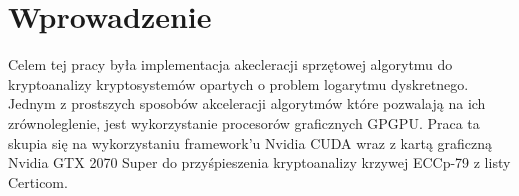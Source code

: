 \newpage
\section{Wprowadzenie}
Celem tej pracy była implementacja akecleracji sprzętowej algorytmu do kryptoanalizy kryptosystemów opartych
o problem logarytmu dyskretnego. Jednym z prostszych sposobów akceleracji algorytmów które
pozwalają na ich zrównoleglenie, jest wykorzystanie procesorów graficznych GPGPU.
Praca ta skupia się na wykorzystaniu framework'u Nvidia CUDA wraz z kartą graficzną Nvidia GTX 2070 Super
do przyśpieszenia kryptoanalizy krzywej ECCp-79 z listy Certicom.
